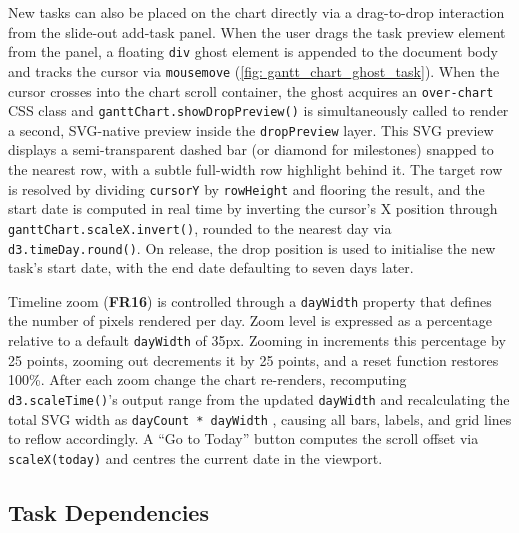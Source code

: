 \documentclass[12pt,nonacm,acmlarge,titlepage,screen]{acmart}
\begin{document}
New tasks can also be placed on the chart directly via a drag-to-drop interaction from 
the slide-out add-task panel. When the user drags the task preview element from
the panel, a floating \texttt{div} ghost element is appended to the document body and 
tracks the cursor via \texttt{mousemove} (\cref{fig: gantt_chart_ghost_task}). When the cursor 
crosses into the chart scroll container, the ghost acquires an \texttt{over-chart} CSS 
class and \texttt{ganttChart.showDropPreview()}\cite{bostock_d3, geeksforgeeks_d3js_2025, w3schools_d3js_2025} is simultaneously called to render a second,
SVG-native preview inside the \texttt{dropPreview} layer. This SVG preview displays 
a semi-transparent dashed bar (or diamond for milestones) snapped to the nearest  
row, with a subtle full-width row highlight behind it. The target row is resolved 
by dividing \texttt{cursorY} by \texttt{rowHeight} and flooring the result, and the
start date is computed in real time by inverting the cursor's X position through 
\texttt{ganttChart.scaleX.invert()}\cite{bostock_d3, geeksforgeeks_d3js_2025, w3schools_d3js_2025}, rounded to the nearest day via
\texttt{d3.timeDay.round()}\cite{bostock_d3, geeksforgeeks_d3js_2025, w3schools_d3js_2025}. On release, the drop position is used to initialise 
the new task's start date, with the end date defaulting to seven days later.

Timeline zoom (\textbf{FR16}\label{fr:16}) is controlled through a \texttt{dayWidth}
property that defines the number of pixels rendered per day. Zoom level is expressed as a
percentage relative to a default \texttt{dayWidth} of 35px. Zooming in increments this
percentage by 25 points, zooming out decrements it by 25 points, and a reset function
restores 100\%. After each zoom change the chart re-renders, recomputing
\texttt{d3.scaleTime()}'s \cite{bostock_d3, geeksforgeeks_d3js_2025, w3schools_d3js_2025} output range from the updated \texttt{dayWidth} and recalculating
the total SVG width as \texttt{dayCount * dayWidth} \cite{bostock_d3, geeksforgeeks_d3js_2025, w3schools_d3js_2025}, causing all bars, labels, and grid
lines to reflow accordingly. A ``Go to Today'' button computes the scroll offset via
\texttt{scaleX(today)} and centres the current date in the viewport.

\subsection{Task Dependencies} \label{sec:impl_deps}
\end{document}
